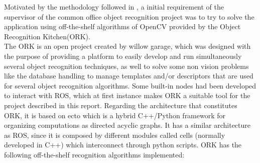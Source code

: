 \documentclass[fontsize=12pt]{article}
\begin{document}
Motivated by the methodology followed in \cite{bib:semantic}, a initial requirement of the supervisor of the common office object recognition project was to try to solve the application using off-the-shelf algorithms of OpenCV \cite{bib:OCV} provided by the Object Recognition Kitchen(ORK).\\
The ORK is an open project created by willow garage, which was designed with the purpose of providing a platform to easily develop and run simultaneously several object recognition techniques, as well to solve some non vision problems like the database handling to manage templates and/or descriptors that are used for several object recognition algorithms.     
Some built-in nodes had been developed to interact with ROS, which at first instance makes ORK a suitable tool for the project described in this report. Regarding the architecture that constitutes ORK, it is based on ecto \cite{bib:ecto} which is a hybrid C++/Python framework for organizing computations as directed acyclic graphs. It has a similar architecture as ROS, since it is composed by different modules called cells (normally developed in C++) which interconnect through python scripts. 
ORK has the following off-the-shelf recognition algorithms implemented:
\end{document}
